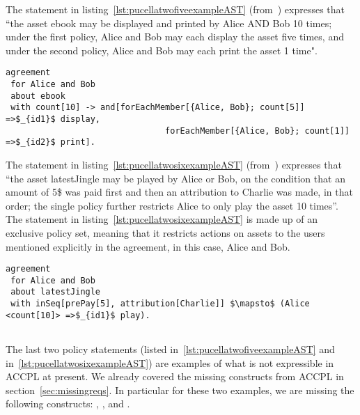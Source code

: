 The statement in listing~\ref{lst:pucellatwofiveexampleAST} (from~\cite{pucella2006}) expresses that ``the asset ebook may be displayed and printed by Alice AND Bob 10 times; under the first policy, Alice and Bob may each display the asset five times, and under the second policy, Alice and Bob may each print the asset 1 time".


\lstset{language=Pucella2006}
\begin{minipage}[c]{0.95\textwidth}
\begin{lstlisting}[frame=single, caption={Agreement of Example 2.5}, label={lst:pucellatwofiveexampleAST}, mathescape]
agreement
 for Alice and Bob 
 about ebook 
 with count[10] -> and[forEachMember[{Alice, Bob}; count[5]] =>$_{id1}$ display, 
                                forEachMember[{Alice, Bob}; count[1]] =>$_{id2}$ print].
\end{lstlisting}
\end{minipage} 
%


The statement in listing~\ref{lst:pucellatwosixexampleAST} (from~\cite{pucella2006}) expresses that ``the asset latestJingle may be played by Alice or Bob, on the condition that an amount of 5\$ was paid first and then an attribution to Charlie was made, in that order; the single policy further restricts Alice to only play the asset 10 times''. The statement in listing~\ref{lst:pucellatwosixexampleAST} is made up of an exclusive policy set, meaning that it restricts actions on assets to the users mentioned explicitly in the agreement, in this case, Alice and Bob.

\lstset{language=Pucella2006}
\begin{minipage}[c]{0.95\textwidth}
\begin{lstlisting}[frame=single, caption={Agreement of Example 2.6}, label={lst:pucellatwosixexampleAST}, mathescape]
agreement
 for Alice and Bob 
 about latestJingle 
 with inSeq[prePay[5], attribution[Charlie]] $\mapsto$ (Alice <count[10]> =>$_{id1}$ play). 
                                    
\end{lstlisting}
\end{minipage} 

The last two policy statements (listed in~\ref{lst:pucellatwofiveexampleAST} and in~\ref{lst:pucellatwosixexampleAST}) are examples of what is not expressible in \ac{ACCPL} at present. We already covered the missing constructs from \ac{ACCPL} in section~\ref{sec:missingreqs}. In particular for these two examples, we are missing the following constructs: , ,  and .


